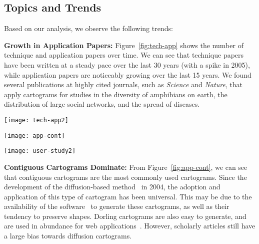 \documentclass{egpubl}
\begin{document}
\subsection{Topics and Trends}

Based on our analysis, we observe the following trends:

\textbf{Growth in Application Papers:}
Figure~\ref{fig:tech-app} shows the number of technique and application papers over time. We can see that technique papers have been written at a steady pace over the last 30 years (with a spike in 2005), while application papers are noticeably growing over the last 15 years. We found several publications at highly cited journals, such as {\em Science} and {\em Nature}, that apply cartograms for studies in the diversity of amphibians on earth, the distribution of large social networks, and the spread of diseases. 


\begin{figure*}[htbp]
\begin{center}
\texttt{[image: tech-app2]}
\caption{Evolution of technique and application papers on cartograms. Downward bars
indicate the number of times a paper has been cited in that year.}
\label{fig:tech-app}
\end{center}
\end{figure*} 

\begin{figure*}[htbp]
\begin{center}
\texttt{[image: app-cont]}
\caption{Application papers with references to contiguous cartograms.}
\label{fig:app-cont}
\end{center}
\end{figure*} 

\begin{figure*}[htbp]
\begin{center}
\texttt{[image: user-study2]}
\caption{Evaluation of cartograms.}
\label{fig:user-study}
\end{center}
\end{figure*} 



\textbf{Contiguous Cartograms Dominate:}
From Figure~\ref{fig:app-cont}, we can see that contiguous cartograms are the most commonly used cartograms. Since the development of the diffusion-based method~\cite{GN04} in 2004, the adoption and application of this type of cartogram has been universal. This may be due to the availability of the software~\cite{carto_sw} to generate these cartograms, as well as their tendency to preserve shapes. Dorling cartograms are also easy to generate, and are used in abundance for web applications~\cite{Proto, Hans, Hans2, NYT_O, Guar}. However, scholarly articles still have a large bias towards diffusion cartograms.
\end{document}

